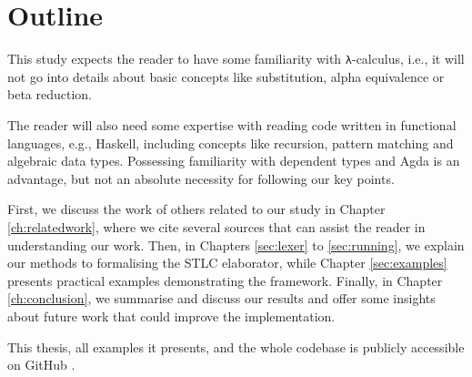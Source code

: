 \chapter{Outline}
\label{ch:outline}

This study expects the reader to have some familiarity with \verb$λ$-calculus, i.e., it will not go into details about basic concepts like substitution, alpha equivalence or beta reduction.

The reader will also need some expertise with reading code written in functional languages, e.g., Haskell, including concepts like recursion, pattern matching and algebraic data types. Possessing familiarity with dependent types and Agda is an advantage, but not an absolute necessity for following our key points.

First, we discuss the work of others related to our study in Chapter \ref{ch:relatedwork}, where we cite several sources that can assist the reader in understanding our work. Then, in Chapters \ref{sec:lexer} to \ref{sec:running}, we explain our methods to formalising the STLC elaborator, while Chapter \ref{sec:examples} presents practical examples demonstrating the framework. Finally, in Chapter \ref{ch:conclusion}, we summarise and discuss our results and offer some insights about future work that could improve the implementation.

This thesis, all examples it presents, and the whole codebase is publicly accessible on GitHub \cite{home-repo}.

